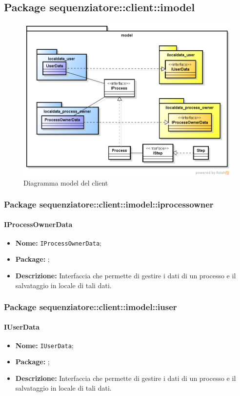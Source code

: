 \subsection{Package sequenziatore::client::imodel}
\begin{figure}[H] \centering \includegraphics[width=%
\textwidth]
{./pack/clientmodel.png} \caption{Diagramma model del client}
\end{figure}
\subsubsection{Package sequenziatore::client::imodel::iprocessowner}
\paragraph{IProcessOwnerData}
\begin{itemize}
\item \textbf{Nome:} \texttt{IProcessOwnerData};
\item \textbf{Package:} \texttt{\iModelAdmin{}};
\item \textbf{Descrizione:} Interfaccia che permette di gestire i dati di un processo e il salvataggio in locale di tali dati.
\end{itemize}

\subsubsection{Package sequenziatore::client::imodel::iuser}
\paragraph{IUserData}
\begin{itemize}
\item \textbf{Nome:} \texttt{IUserData};
\item \textbf{Package:} \texttt{\iModelUser{}};
\item \textbf{Descrizione:} Interfaccia che permette di gestire i dati di un processo e il salvataggio in locale di tali dati.
\end{itemize}

